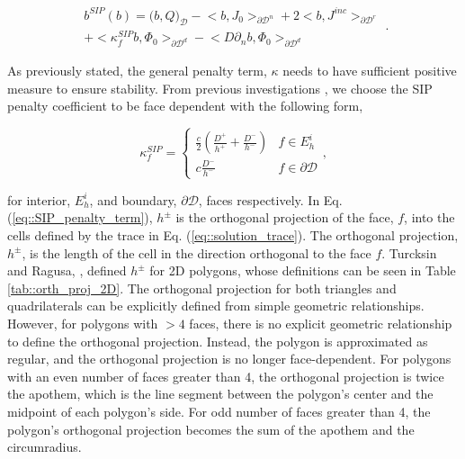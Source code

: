 \begin{equation}
\label{eq::SIP_linear_form}
\begin{aligned}
b^{SIP} (b) = \Big(  b, Q  \Big)_{\mathcal{D}}  - \Big<   b, J_{0}  \Big>_{\partial \mathcal{D}^n} +  2 \Big<  b, J^{inc}  \Big>_{\partial \mathcal{D}^r} \\ + \Big< \kappa_f^{SIP}  b, \Phi_0  \Big>_{\partial \mathcal{D}^d} - \Big<    D \partial_n b ,\Phi_0 \Big>_{\partial \mathcal{D}^d} 
\end{aligned} .
\end{equation}

\noindent As previously stated, the general penalty term, $\kappa$ needs to have sufficient positive measure to ensure stability. From previous investigations \cite{ref::DSA_wang_ragusa,wang2009adaptive,turcksin2014discontinuous}, we choose the SIP penalty coefficient to be face dependent with the following form,

\begin{equation}
\kappa_f^{SIP} = 
\begin{cases}
	\frac{c}{2} \left(  \frac{D^+}{h^+} + \frac{D^-}{h^-} \right) & f \in E_h^i\\ 
	c \frac{D^-}{h^-}& f \in \partial \mathcal{D}
\end{cases},
\label{eq::SIP_penalty_term}
\end{equation}

\noindent for interior, $E_h^i$, and boundary, $\partial \mathcal{D}$, faces respectively. In Eq. (\ref{eq::SIP_penalty_term}), $h^\pm$ is the orthogonal projection of the face, $f$, into the cells defined by the trace in Eq. (\ref{eq::solution_trace}). The orthogonal projection, $h^\pm$, is the length of the cell in the direction orthogonal to the face $f$. Turcksin and Ragusa, \cite{turcksin2014discontinuous}, defined $h^\pm$ for 2D polygons, whose definitions can be seen in Table \ref{tab::orth_proj_2D}. The orthogonal projection for both triangles and quadrilaterals can be explicitly defined from simple geometric relationships. However, for polygons with $>4$ faces, there is no explicit geometric relationship to define the orthogonal projection. Instead, the polygon is approximated as regular, and the orthogonal projection is no longer face-dependent. For polygons with an even number of faces greater than 4, the orthogonal projection is twice the apothem, which is the line segment between the polygon's center and the midpoint of each polygon's side. For odd number of faces greater than 4, the polygon's orthogonal projection becomes the sum of the apothem and the circumradius.

